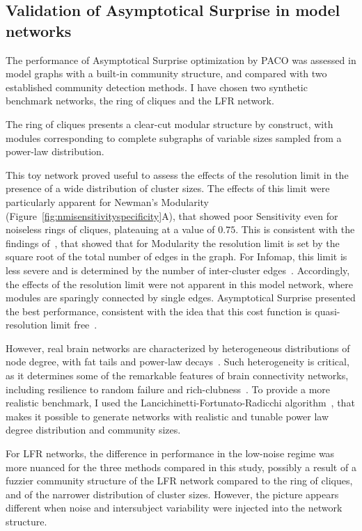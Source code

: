\subsection{Validation of Asymptotical Surprise in model networks}
The performance of Asymptotical Surprise optimization by PACO was assessed in model graphs with a built-in community structure, and compared with two established community detection methods.
I have chosen two synthetic benchmark networks, the ring of cliques and the LFR network.

The ring of cliques presents a clear-cut modular structure by construct, with modules corresponding to complete subgraphs of variable sizes sampled from a power-law distribution.

This toy network proved useful to assess the effects of the resolution limit in the presence of a wide distribution of cluster sizes.
The effects of this limit were particularly apparent for Newman's Modularity (Figure~\ref{fig:nmisensitivityspecificity}A), that showed poor Sensitivity even for noiseless rings of cliques, plateauing at a value of $0.75$.
This is consistent with the findings of~\cite{fortunato2007}, that showed that for Modularity the resolution limit is set by the square root of the total number of edges in the graph.
For Infomap, this limit is less severe and is determined by the number of inter-cluster edges~\cite{kawamoto2015}.
Accordingly, the effects of the resolution limit were not apparent in this model network, where modules are sparingly connected by single edges.
Asymptotical Surprise presented the best performance, consistent with the idea that this cost function is quasi-resolution limit free~\cite{traag2015}.

However, real brain networks are characterized by heterogeneous distributions of node degree, with fat tails and power-law decays~\cite{bullmore2009}.
Such heterogeneity is critical, as it determines some of the remarkable features of brain connectivity networks, including resilience to random failure and rich-clubness~\cite{vandenheuvel2011,vandenheuvel2013a}.
To provide a more realistic benchmark, I used the Lancichinetti-Fortunato-Radicchi algorithm~\cite{lancichinetti2008}, that makes it possible to generate networks with realistic and tunable power law degree distribution and community sizes.

For LFR networks, the difference in performance in the low-noise regime was more nuanced for the three methods compared in this study, possibly a result of a fuzzier community structure of the LFR network compared to the ring of cliques, and of the narrower distribution of cluster sizes.
However, the picture appears different when noise and intersubject variability were injected into the network structure.

